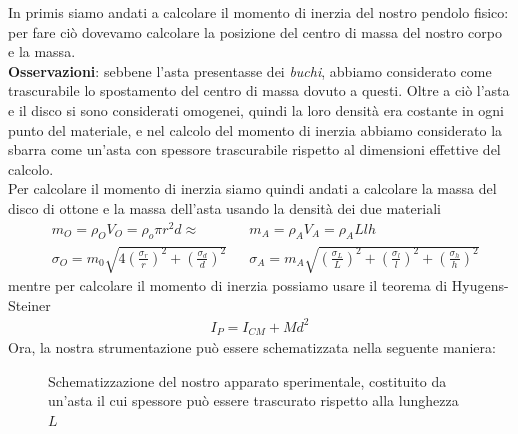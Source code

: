 \documentclass{article}
\begin{document}
In primis siamo andati a calcolare il momento di inerzia del nostro pendolo fisico: per fare ciò dovevamo calcolare la posizione del centro di massa del nostro corpo e la massa. \\
\textbf{Osservazioni}: sebbene l'asta presentasse dei \emph{buchi}, abbiamo considerato come trascurabile lo spostamento del centro di massa dovuto a questi. Oltre a ciò l'asta e il disco si sono considerati omogenei, quindi la loro densità era costante in ogni punto del materiale, e nel calcolo del momento di inerzia abbiamo considerato la sbarra come un'asta con spessore trascurabile rispetto al dimensioni effettive del calcolo. \\
Per calcolare il momento di inerzia siamo quindi andati a calcolare la massa del disco di ottone e la massa dell'asta usando la densità dei due materiali
\begin{align*}
	&m_O = \rho_O V_O = \rho_o \pi r^2 d \approx & &m_A = \rho_A V_A = \rho_A Llh \\
	&\sigma_O = m_0 \sqrt{4 \left(\frac{\sigma_r}{r} \right)^2 + \left( \frac{\sigma_d}{d} \right)^2}  & &\sigma_A = m_A \sqrt{ \left(\frac{\sigma_L}{L} \right)^2 + \left( \frac{\sigma_l}{l} \right)^2 + \left( \frac{\sigma_h}{h} \right)^2}
\end{align*}
mentre per calcolare il momento di inerzia possiamo usare il teorema di Hyugens-Steiner
\begin{align*}
	I_P = I_{CM} + Md^2
\end{align*}
Ora, la nostra strumentazione può essere schematizzata nella seguente maniera:
\begin{figure}[H]
	\centering
{}
\caption{Schematizzazione del nostro apparato sperimentale, costituito da un'asta il cui spessore può essere trascurato rispetto alla lunghezza $L$}
\end{figure}
\end{document}
